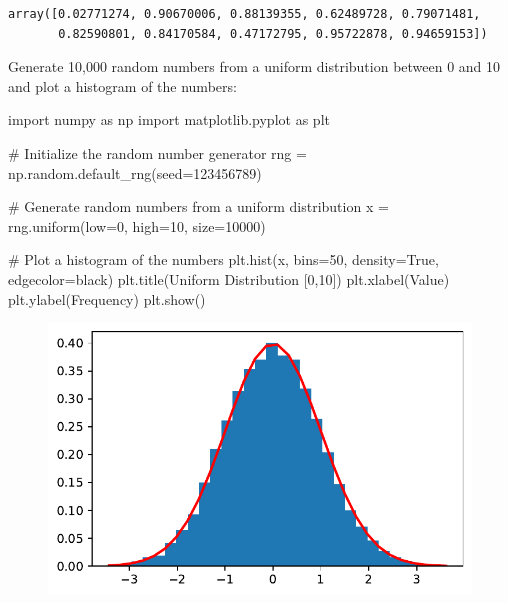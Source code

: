 \documentclass[
  letterpaper,
  DIV=11,
  numbers=noendperiod]{scrreprt}
\newenvironment{Shaded}{\begin{snugshade}}{\end{snugshade}}
\newcommand{\CommentTok}[1]{\textcolor[rgb]{0.37,0.37,0.37}{#1}}
\newcommand{\DecValTok}[1]{\textcolor[rgb]{0.68,0.00,0.00}{#1}}
\newcommand{\ImportTok}[1]{\textcolor[rgb]{0.00,0.46,0.62}{#1}}
\newcommand{\NormalTok}[1]{\textcolor[rgb]{0.00,0.23,0.31}{#1}}
\newcommand{\OperatorTok}[1]{\textcolor[rgb]{0.37,0.37,0.37}{#1}}
\newcommand{\StringTok}[1]{\textcolor[rgb]{0.13,0.47,0.30}{#1}}
\newcommand{\VariableTok}[1]{\textcolor[rgb]{0.07,0.07,0.07}{#1}}
\begin{document}
\begin{verbatim}
array([0.02771274, 0.90670006, 0.88139355, 0.62489728, 0.79071481,
       0.82590801, 0.84170584, 0.47172795, 0.95722878, 0.94659153])
\end{verbatim}

Generate 10,000 random numbers from a uniform distribution between 0 and
10 and plot a histogram of the numbers:

\begin{Shaded}
\begin{Highlighting}[]
\ImportTok{import}\NormalTok{ numpy }\ImportTok{as}\NormalTok{ np}
\ImportTok{import}\NormalTok{ matplotlib.pyplot }\ImportTok{as}\NormalTok{ plt}

\CommentTok{\# Initialize the random number generator}
\NormalTok{rng }\OperatorTok{=}\NormalTok{ np.random.default\_rng(seed}\OperatorTok{=}\DecValTok{123456789}\NormalTok{)}

\CommentTok{\# Generate random numbers from a uniform distribution}
\NormalTok{x }\OperatorTok{=}\NormalTok{ rng.uniform(low}\OperatorTok{=}\DecValTok{0}\NormalTok{, high}\OperatorTok{=}\DecValTok{10}\NormalTok{, size}\OperatorTok{=}\DecValTok{10000}\NormalTok{)}

\CommentTok{\# Plot a histogram of the numbers}
\NormalTok{plt.hist(x, bins}\OperatorTok{=}\DecValTok{50}\NormalTok{, density}\OperatorTok{=}\VariableTok{True}\NormalTok{, edgecolor}\OperatorTok{=}\StringTok{\textquotesingle{}black\textquotesingle{}}\NormalTok{)}
\NormalTok{plt.title(}\StringTok{\textquotesingle{}Uniform Distribution [0,10]\textquotesingle{}}\NormalTok{)}
\NormalTok{plt.xlabel(}\StringTok{\textquotesingle{}Value\textquotesingle{}}\NormalTok{)}
\NormalTok{plt.ylabel(}\StringTok{\textquotesingle{}Frequency\textquotesingle{}}\NormalTok{)}
\NormalTok{plt.show()}
\end{Highlighting}
\end{Shaded}

\begin{figure}[H]

{\centering \includegraphics{006_num_gp_files/figure-pdf/cell-15-output-1.pdf}

}

\end{figure}
\end{document}
